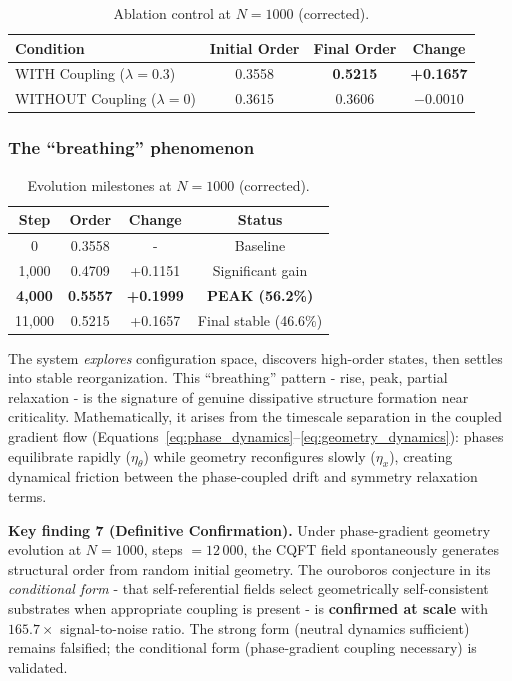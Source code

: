 \documentclass[12pt,a4paper]{article}
\theoremstyle{plain}
\theoremstyle{definition}
\begin{document}
\begin{table}[H]
\centering
\caption{Ablation control at $N=1000$ (corrected).}
\label{tab:ablation1000}
\begin{tabular}{lccc}
\toprule
\textbf{Condition} & \textbf{Initial Order} & \textbf{Final Order} &
  \textbf{Change} \\
\midrule
WITH Coupling ($\lambda = 0.3$) & 0.3558 & \textbf{0.5215} & \textbf{+0.1657} \\
WITHOUT Coupling ($\lambda = 0$) & 0.3615 & 0.3606          & $-0.0010$ \\
\bottomrule
\end{tabular}
\end{table}

\subsubsection{The ``breathing'' phenomenon}

\begin{table}[H]
\centering
\caption{Evolution milestones at $N=1000$ (corrected).}
\label{tab:milestones}
\begin{tabular}{cccc}
\toprule
\textbf{Step} & \textbf{Order} & \textbf{Change} & \textbf{Status} \\
\midrule
0              & 0.3558          & -             & Baseline \\
1{,}000        & 0.4709          & +0.1151         & Significant gain \\
\textbf{4{,}000}& \textbf{0.5557} & \textbf{+0.1999}& \textbf{PEAK (56.2\%)} \\
11{,}000       & 0.5215          & +0.1657         & Final stable (46.6\%) \\
\bottomrule
\end{tabular}
\end{table}

The system \emph{explores} configuration space, discovers high-order
states, then settles into stable reorganization. This ``breathing''
pattern - rise, peak, partial relaxation - is the signature of genuine
dissipative structure formation near criticality. Mathematically, it
arises from the timescale separation in the coupled gradient flow
(Equations~\ref{eq:phase_dynamics}--\ref{eq:geometry_dynamics}): phases
equilibrate rapidly ($\eta_\theta$) while geometry reconfigures slowly
($\eta_x$), creating dynamical friction between the phase-coupled drift
and symmetry relaxation terms.

\newpage
\begin{keyresult}
\textbf{Key finding 7 (Definitive Confirmation).} Under phase-gradient
geometry evolution at $N = 1000$, steps $= 12\,000$, the CQFT field
spontaneously generates structural order from random initial geometry.
The ouroboros conjecture in its \emph{conditional form} - that
self-referential fields select geometrically self-consistent substrates
when appropriate coupling is present - is \textbf{confirmed at scale}
with $165.7\times$ signal-to-noise ratio. The strong form (neutral
dynamics sufficient) remains falsified; the conditional form
(phase-gradient coupling necessary) is validated.
\end{keyresult}
\end{document}
